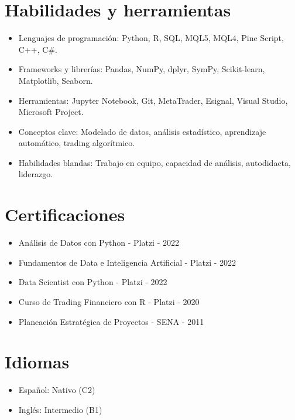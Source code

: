 \documentclass[letterpaper,12pt]{article}
\begin{document}
\section*{Habilidades y herramientas}

\begin{itemize}
    \item Lenguajes de programación: Python, R, SQL, MQL5, MQL4, Pine Script, C++, C$\#$.
    \item Frameworks y librerías: Pandas, NumPy, dplyr, SymPy, Scikit-learn, Matplotlib, Seaborn.
    \item Herramientas: Jupyter Notebook, Git, MetaTrader, Esignal, Visual Studio, Microsoft Project.
    \item Conceptos clave: Modelado de datos, análisis estadístico, aprendizaje automático, trading algorítmico.
    \item Habilidades blandas: Trabajo en equipo, capacidad de análisis, autodidacta, liderazgo.
\end{itemize}

\section*{Certificaciones}

\begin{itemize}
    \item Análisis de Datos con Python - Platzi - 2022
    \item Fundamentos de Data e Inteligencia Artificial - Platzi - 2022
    \item Data Scientist con Python - Platzi - 2022
    \item Curso de Trading Financiero con R - Platzi - 2020
    \item Planeación Estratégica de Proyectos - SENA - 2011
\end{itemize}

\section*{Idiomas}

\begin{itemize}
    \item Español: Nativo (C2)
    \item Inglés: Intermedio (B1)
\end{itemize}
\end{document}
